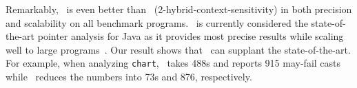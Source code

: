 Remarkably, \onesobjHT~is even better than
\twosobjH~(2-hybrid-context-sensitivity) in both precision and
scalability on all benchmark programs.  \twosobjH~is currently
considered the state-of-the-art pointer analysis for Java as it
provides most precise results while scaling well to large
programs~\cite{TanLX16,KastrinisS13a,JeJeChOh17}.  Our result
shows that \onesobjHT~can supplant the state-of-the-art. For example, when
analyzing {\tt chart}, \twosobjH~takes 488s and reports 915 may-fail
casts while \onesobjHT~reduces the numbers into 73s and 876,
respectively.  %


